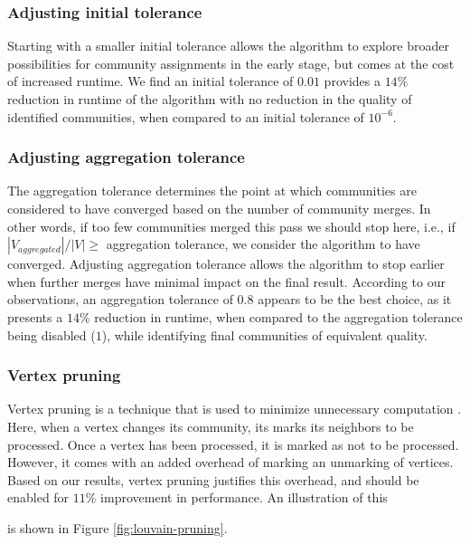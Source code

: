 \subsubsection{Adjusting initial tolerance}

Starting with a smaller initial tolerance allows the algorithm to explore broader possibilities for community assignments in the early stage, but comes at the cost of increased runtime. We find an initial tolerance of $0.01$ provides a $14\%$ reduction in runtime of the algorithm with no reduction in the quality of identified communities, when compared to an initial tolerance of $10^{-6}$.


\subsubsection{Adjusting aggregation tolerance}

The aggregation tolerance determines the point at which communities are considered to have converged based on the number of community merges. In other words, if too few communities merged this pass we should stop here, i.e., if $|V_{aggregated}|/|V| \geq$ aggregation tolerance, we consider the algorithm to have converged. Adjusting aggregation tolerance allows the algorithm to stop earlier when further merges have minimal impact on the final result. According to our observations, an aggregation tolerance of $0.8$ appears to be the best choice, as it presents a $14\%$ reduction in runtime, when compared to the aggregation tolerance being disabled ($1$), while identifying final communities of equivalent quality.


\subsubsection{Vertex pruning}

Vertex pruning is a technique that is used to minimize unnecessary computation \cite{com-ryu16, com-ozaki16, com-zhang21, com-shi21}. Here, when a vertex changes its community, its marks its neighbors to be processed. Once a vertex has been processed, it is marked as not to be processed. However, it comes with an added overhead of marking an unmarking of vertices. Based on our results, vertex pruning justifies this overhead, and should be enabled for $11\%$ improvement in performance. An illustration of this is shown in Figure \ref{fig:louvain-pruning}.






